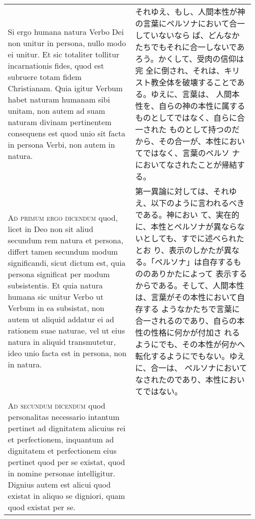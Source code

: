 \documentclass[10pt]{jsarticle} %
\begin{document}
\begin{longtable}{p{21em}p{21em}}
\\




Si ergo humana natura Verbo Dei non unitur in persona, nullo modo ei
unitur.  Et sic totaliter tollitur incarnationis fides, quod est
subruere totam fidem Christianam. Quia igitur Verbum habet naturam
humanam sibi unitam, non autem ad suam naturam divinam pertinentem
consequens est quod unio sit facta in persona Verbi, non autem in
natura.


&

それゆえ、もし、人間本性が神の言葉にペルソナにおいて合一していないなら
ば、どんなかたちでもそれに合一しないであろう。かくして、受肉の信仰は完
全に倒され、それは、キリスト教全体を破壊することである。ゆえに、言葉は、
人間本性を、自らの神の本性に属するものとしてではなく、自らに合一された
ものとして持つのだから、その合一が、本性においてではなく、言葉のペルソ
ナにおいてなされたことが帰結する。

\\



{\scshape Ad primum ergo dicendum} quod, licet in Deo non sit aliud
secundum rem natura et persona, differt tamen secundum modum
significandi, sicut dictum est, quia persona significat per modum
subsistentis. Et quia natura humana sic unitur Verbo ut Verbum in ea
subsistat, non autem ut aliquid addatur ei ad rationem suae naturae,
vel ut eius natura in aliquid transmutetur, ideo unio facta est in
persona, non in natura.


&

第一異論に対しては、それゆえ、以下のように言われるべきである。神におい
て、実在的に、本性とペルソナが異ならないとしても、すでに述べられたとお
り、表示のしかたが異なる。「ペルソナ」は自存するもののありかたによって
表示するからである。そして、人間本性は、言葉がその本性において自存する
ようなかたちで言葉に合一されるのであり、自らの本性の性格に何かが付加さ
れるようにでも、その本性が何かへ転化するようにでもない。ゆえに、合一は、
ペルソナにおいてなされたのであり、本性においてではない。

\\



{\scshape Ad secundum dicendum} quod personalitas necessario intantum
pertinet ad dignitatem alicuius rei et perfectionem, inquantum ad
dignitatem et perfectionem eius pertinet quod per se existat, quod in
nomine personae intelligitur. Dignius autem est alicui quod existat in
aliquo se digniori, quam quod existat per se.


\end{longtable}
\end{document}
